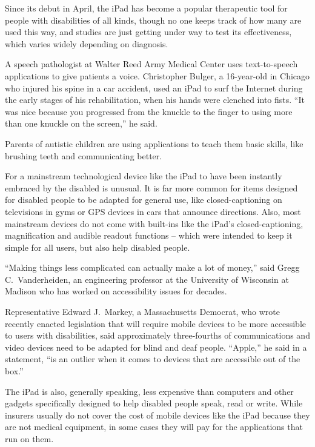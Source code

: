 ﻿\documentclass[12pt]{article}
\begin{document}
Since its debut in April, the iPad has become a popular therapeutic tool for people with
disabilities of all kinds, though no one keeps track of how many are used this way, and studies are
just getting under way to test its effectiveness, which varies widely depending on diagnosis.

A speech pathologist at Walter Reed Army Medical Center uses text-to-speech applications to give
patients a voice. Christopher Bulger, a 16-year-old in Chicago who injured his spine in a car
accident, used an iPad to surf the Internet during the early stages of his rehabilitation, when his
hands were clenched into fists. ``It was nice because you progressed from the knuckle to the finger
to using more than one knuckle on the screen,'' he said.

Parents of autistic children are using applications to teach them basic skills, like brushing teeth
and communicating better.

For a mainstream technological device like the iPad to have been instantly embraced by the disabled
is unusual. It is far more common for items designed for disabled people to be adapted for general
use, like closed-captioning on televisions in gyms or GPS devices in cars that announce directions.
Also, most mainstream devices do not come with built-ins like the iPad's closed-captioning,
magnification and audible readout functions -- which were intended to keep it simple for all users,
but also help disabled people.

``Making things less complicated can actually make a lot of money,'' said Gregg C.~Vanderheiden, an
engineering professor at the University of Wisconsin at Madison who has worked on accessibility
issues for decades.

Representative Edward J.~Markey, a Massachusetts Democrat, who wrote recently enacted legislation
that will require mobile devices to be more accessible to users with disabilities, said
approximately three-fourths of communications and video devices need to be adapted for blind and
deaf people. ``Apple,'' he said in a statement, ``is an outlier when it comes to devices that are
accessible out of the box.''

The iPad is also, generally speaking, less expensive than computers and other gadgets specifically
designed to help disabled people speak, read or write. While insurers usually do not cover the cost
of mobile devices like the iPad because they are not medical equipment, in some cases they will pay
for the applications that run on them.
\end{document}
